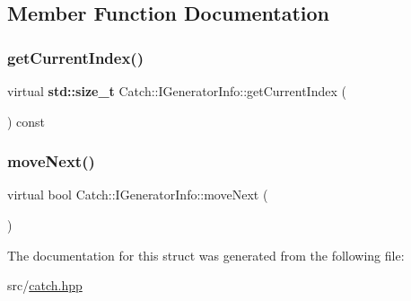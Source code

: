 \subsection{Member Function Documentation}
\mbox{\label{struct_catch_1_1_i_generator_info_a6a0dca712d31f6849fd9447b1344673a}} 
\subsubsection{\texorpdfstring{get\+Current\+Index()}{getCurrentIndex()}}
{\footnotesize\ttfamily virtual \textbf{ std\+::size\+\_\+t} Catch\+::\+I\+Generator\+Info\+::get\+Current\+Index (\begin{DoxyParamCaption}{ }\end{DoxyParamCaption}) const\hspace{0.3cm}{\ttfamily [pure virtual]}}

\mbox{\label{struct_catch_1_1_i_generator_info_a2b86711ca7009903edfe27ed62b515ef}} 
\subsubsection{\texorpdfstring{move\+Next()}{moveNext()}}
{\footnotesize\ttfamily virtual bool Catch\+::\+I\+Generator\+Info\+::move\+Next (\begin{DoxyParamCaption}{ }\end{DoxyParamCaption})\hspace{0.3cm}{\ttfamily [pure virtual]}}



The documentation for this struct was generated from the following file\+:\begin{DoxyCompactItemize}
\item 
src/\hyperlink{catch_8hpp}{catch.\+hpp}\end{DoxyCompactItemize}
